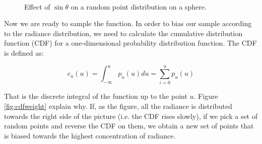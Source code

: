 \begin{figure}[!ht]
\centering
{}
 \\
\caption{Effect of $\sin\theta$ on a random point distribution on a sphere.}
\label{fig:randomsamplingsphere}
\end{figure}

Now we are ready to sample the function. In order to bias our sample according to the radiance distribution, we need to calculate the cumulative distribution function (CDF) for a one-dimensional probability distribution function. The CDF is defined as:

$$
c_u(u) = \int_{-\infty}^{u} p_u(u) du = \sum_{i=0}^u p_u(u)
$$

That is the discrete integral of the function up to the point $u$. Figure \ref{fig:cdfweight} explain why. If, as the figure, all the radiance is distributed towards the right side of the picture (i.e. the CDF rises slowly), if we pick a set of random points and reverse the CDF on them, we obtain a new set of points that is biased towards the highest concentration of radiance.


